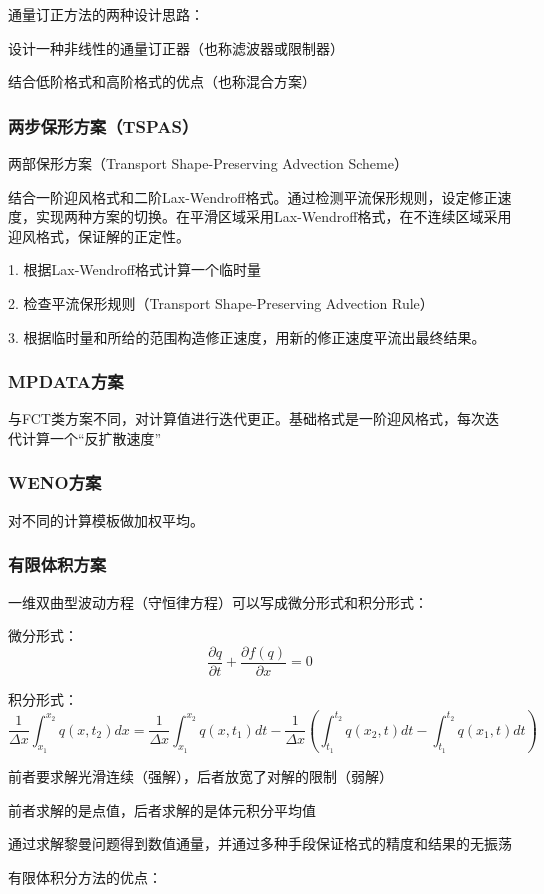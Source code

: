 \documentclass{article}
\begin{document}
通量订正方法的两种设计思路：

设计一种非线性的通量订正器（也称滤波器或限制器）

结合低阶格式和高阶格式的优点（也称混合方案）

\subsubsection{两步保形方案（TSPAS）}
两部保形方案（Transport Shape-Preserving Advection Scheme）

结合一阶迎风格式和二阶Lax-Wendroff格式。通过检测平流保形规则，设定修正速度，实现两种方案的切换。在平滑区域采用Lax-Wendroff格式，在不连续区域采用迎风格式，保证解的正定性。

1. 根据Lax-Wendroff格式计算一个临时量

2. 检查平流保形规则（Transport Shape-Preserving Advection Rule）

3. 根据临时量和所给的范围构造修正速度，用新的修正速度平流出最终结果。

\subsubsection{MPDATA方案}
与FCT类方案不同，对计算值进行迭代更正。基础格式是一阶迎风格式，每次迭代计算一个“反扩散速度”

\subsubsection{WENO方案}
对不同的计算模板做加权平均。

\subsubsection{有限体积方案}
一维双曲型波动方程（守恒律方程）可以写成微分形式和积分形式：

微分形式：
$$\frac{\partial q}{\partial t} +\frac{\partial f(q)}{\partial x}=0$$

积分形式：
$$\frac{1}{\Delta x}\int^{x_2}_{x_1}q(x,t_2)dx=\frac{1}{\Delta x}\int^{x_2}_{x_1}q(x,t_1)dt-\frac{1}{\Delta x}(\int^{t_2}_{t_1}q(x_2,t)dt-\int^{t_2}_{t_1}q(x_1,t)dt)$$

前者要求解光滑连续（强解），后者放宽了对解的限制（弱解）

前者求解的是点值，后者求解的是体元积分平均值

通过求解黎曼问题得到数值通量，并通过多种手段保证格式的精度和结果的无振荡

有限体积分方法的优点：
\end{document}
